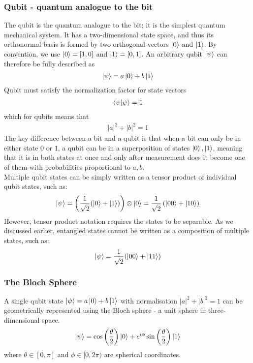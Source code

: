 \subsubsection{Qubit - quantum analogue to the bit}
The qubit is the quantum analogue to the bit; it is the simplest quantum mechanical system. It has a two-dimensional state space, and thus its orthonormal basis is formed by two orthogonal vectors $\ket{0}$ and $\ket{1}$. By convention, we use $\ket{0}=[1,0]$ and $\ket{1}=[0,1]$. An arbitrary qubit $\ket{\psi}$ can therefore be fully described as
\begin{align*}
    \ket{\psi}=a\ket{0}+b\ket{1}
\end{align*}
Qubit must satisfy the normalization factor for state vectors
\begin{align*}
    \braket{\psi|\psi}=1
\end{align*}
which for qubits means that
\begin{align*}
    |a|^2+|b|^2=1
\end{align*}
The key difference between a bit and a qubit is that when a bit can only be in either state $0$ or $1$, a qubit can be in a superposition of states $\ket{0}, \ket{1}$, meaning that it is in both states at once and only after measurement does it become one of them with probabilities proportional to $a,b$.
\\
Multiple qubit states can be simply written as a tensor product of individual qubit states, such as:
\begin{align*}
\ket{\psi} = \left( \frac{1}{\sqrt{2}}(\ket{0} + \ket{1}) \right) \otimes \ket{0}=\frac{1}{\sqrt{2}}\left(\ket{00}+\ket{10}\right)
\end{align*}
However, tensor product notation requires the states to be separable. As we discussed earlier, entangled states cannot be written as a composition of multiple states, such as: 
\begin{align*}
\ket{\psi} = \frac{1}{\sqrt{2}}(\ket{00} + \ket{11})
\end{align*}
\subsubsection{The Bloch Sphere}
A single qubit state $\ket{\psi} = a\ket{0} + b\ket{1}$ with normalisation $|a|^2 + |b|^2 = 1$ can be geometrically represented using the Bloch sphere - a unit sphere in three-dimensional space.
\begin{align*}
    \ket{\psi} = \cos\left(\frac{\theta}{2}\right)\ket{0} + e^{i\phi} \sin\left(\frac{\theta}{2}\right)\ket{1}
\end{align*}
where $\theta \in [0, \pi]$ and $\phi \in [0, 2\pi)$ are spherical coordinates.\\

